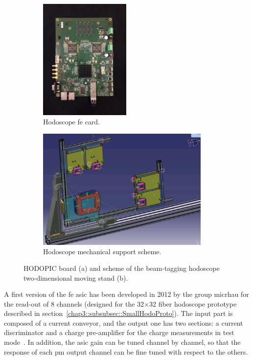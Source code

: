   
\begin{figure}
\centering
\begin{subfigure}[t]{.34\textwidth}
\centering
\includegraphics[width=\linewidth, height = 6cm]{03_GraphicFiles/chapter3_CLaRySproto/Hodoscope/HodoCard1.jpg}
\caption{Hodoscope \gls{fe} card.}
\label{chap3::fig::HodoscopeFEcard}
\end{subfigure}
\begin{subfigure}[t]{.56\textwidth}
\centering
\includegraphics[width=\linewidth, trim = {0 0 1cm 0}, clip = true, height = 6cm]{03_GraphicFiles/chapter3_CLaRySproto/Hodoscope/HodoScheme.png}
\caption{Hodoscope mechanical support scheme.}
\label{chap3::fig::HodoscopeSchemeMech}
\end{subfigure}
\caption{HODOPIC board (a) and scheme of the beam-tagging hodoscope two-dimensional moving stand (b).}
\label{chap3::fig::HodoPic}
\end{figure}

A first version of the \gls{fe} \gls{asic} has been developed in 2012 by the group \gls{micrhau} for the read-out of 8 channels (designed for the 32$\times$32 fiber hodoscope prototype described in section~\ref{chap3::subsubsec::SmallHodoProto}). The input part is composed of a current conveyor, and the output one has two sections: a current discriminator and a charge pre-amplifier for the charge measurements in test mode~\parencite{Deng2012, Deng2013}. In addition, the \gls{asic} gain can be tuned channel by channel, so that the response of each \gls{pm} output channel can be fine tuned with respect to the others.

